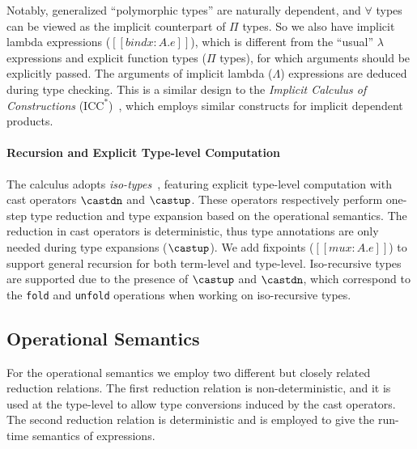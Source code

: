 Notably,
generalized ``polymorphic types'' are naturally dependent, and $\forall$
types can be viewed as the implicit counterpart of $\Pi$ types.
So we also have implicit lambda expressions ($[[bind x : A. e]]$),
which is different from the ``usual'' $\lambda$ expressions and explicit function
types ($\Pi$ types), for which arguments should be explicitly passed. The arguments
of implicit lambda ($\Lambda$) expressions are deduced during type checking.
This is a similar design to
the \emph{Implicit Calculus of Constructions} ($\text{ICC}^*$)~\citep{barras2008implicit}, which
employs similar constructs for implicit dependent products.


\paragraph{Recursion and Explicit Type-level Computation}
\label{sec:cast}
The \name calculus adopts \emph{iso-types}~\citep{isotype,yang2019pure},
featuring explicit type-level computation with cast operators
$\castdn$ and $\castup$. These operators respectively perform one-step
type reduction and type expansion based on the operational semantics.
The reduction in cast operators is deterministic, thus type
annotations are only needed during type expansions ($\castup$). We add
fixpoints ($[[mu x : A. e]]$) to support general recursion for both
term-level and type-level. Iso-recursive types are supported due to
the presence of $\castup$ and $\castdn$, which correspond to the
\verb|fold| and \verb|unfold| operations when working on iso-recursive types.

\subsection{Operational Semantics}\label{subsec:semantics}

For the operational semantics we employ two different but closely related
reduction relations. The first reduction relation is non-deterministic, and
it is used at the type-level to allow type conversions induced
by the cast operators. The second reduction relation is deterministic and
is employed to give the run-time semantics of expressions.

